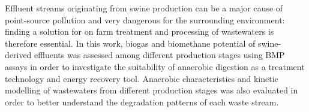 Effluent streams originating from swine production can be a major cause of point-source pollution and very dangerous for the surrounding environment: finding a solution for on farm treatment and processing of wastewaters is therefore essential. In this work, biogas and biomethane potential of swine-derived effluents was assessed among different production stages using BMP assays in order to investigate the suitability of anaerobic digestion as a treatment technology and energy recovery tool. Anaerobic characteristics and kinetic modelling of wastewaters from different production stages was also evaluated in order to better understand the degradation patterns of each waste stream.